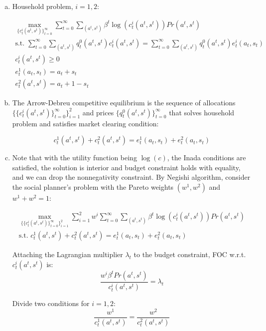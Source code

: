 \documentclass{article}
\begin{document}
\begin{enumerate}[(a)]
\item Household problem, $i=1,2$:

  \begin{gather*}
    \max_{\{c_t^i(a^t,s^t)\}_{t=0}^\infty}
    \sum_{t=0}^\infty
    \sum_{(a^t,s^t)}
    \beta^t\log(c_t^i(a^t,s^t))Pr(a^t,s^t)\\
    \text{s.t. } \sum_{t=0}^\infty \sum_{(a^t,s^t)} q_t^0(a^t,s^t)c_t^i(a^t,s^t) = 
    \sum_{t=0}^\infty \sum_{(a^t,s^t)} q_t^0(a^t,s^t)e_t^i(a_t,s_t)\\
    c_t^i(a^t,s^t)\ge 0\\
    e_t^1(a_t,s_t)=a_t+s_t\\
    e_t^2(a^t,s^t)=a_t+1-s_t
  \end{gather*}

\item The Arrow-Debreu competitive equilibrium is the sequence of
  allocations $\{\{c_t^i(a^t,s^t)\}_{t=0}^\infty\}_{i=1}^2$ and prices
  $\{q_t^0(a^t,s^t)\}_{t=0}^\infty$ that solves household problem and
  satisfies market clearing condition:

  \begin{equation*}
    c_t^1(a^t,s^t)+c_t^2(a^t,s^t)=e_t^1(a_t,s_t)+e_t^2(a_t,s_t)
  \end{equation*}

\item Note that with the utility function being $\log(c)$, the Inada
  conditions are satisfied, the solution is interior and budget
  constraint holds with equality, and we can drop the nonnegativity
  constraint. By Negishi algorithm, consider the social planner's
  problem with the Pareto weights $(w^1, w^2)$ and $w^1+w^2=1$:

\begin{gather*}
    \max_{\{\{c_t^i(a^t,s^t)\}_{t=0}^\infty\}_{i=1}^2}
    \sum_{i=1}^2 w^i
    \sum_{t=0}^\infty
    \sum_{(a^t,s^t)}
    \beta^t\log(c_t^i(a^t,s^t))Pr(a^t,s^t)\\
    \text{s.t. } c_t^1(a^t,s^t)+c_t^2(a^t,s^t)=e_t^1(a_t,s_t)+e_t^2(a_t,s_t)
  \end{gather*}

  Attaching the Lagrangian multiplier $\lambda_t$ to the budget
  constraint, FOC w.r.t. $c_t^i(a^t,s^t)$ is:
\begin{equation*}
  \frac{w^i\beta^tPr(a^t,s^t)}{c_t^i(a^t,s^t)}=\lambda_t
\end{equation*}

Divide two conditions for $i=1,2$:
\begin{equation*}
  \frac{w^1}{c_t^1(a^t,s^t)}=  \frac{w^2}{c_t^2(a^t,s^t)}
\end{equation*}


\end{enumerate}
\end{document}
